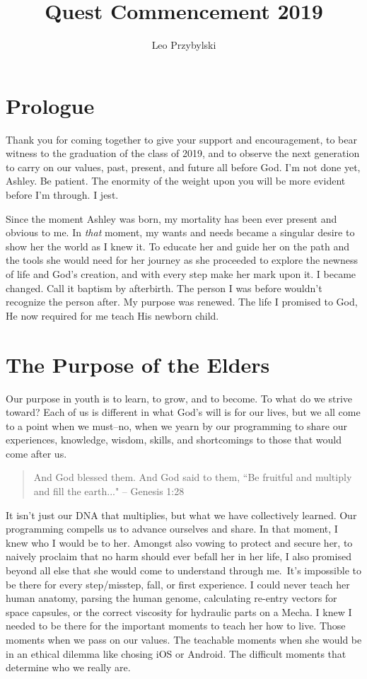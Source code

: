 \documentclass[11pt,a4paper,sans]{article}
\title{Quest Commencement 2019}
\author{Leo Przybylski}
\begin{document}
\maketitle
\tableofcontents
\section{Prologue}

Thank you for coming together to give your support and encouragement, to 
bear witness to the graduation of the class of 2019, and to observe the 
next generation to carry on our values, past, present, and future all before God.
I'm not done yet, Ashley. Be patient. The enormity of the weight upon you will 
be more evident before I'm through. I jest.

Since the moment Ashley was born, my mortality has been ever present and obvious to me.
In \emph{that} moment, my wants and needs became a singular desire to show her the 
world as I knew it. To educate her and guide her on the path and the tools she would 
need for her journey as she proceeded to explore the newness of life and 
God's creation, and with every step make her mark upon it. I became changed. Call it 
baptism by afterbirth. The person I was before wouldn't recognize the person after.
My purpose was renewed. The life I promised to God, He now required for me teach His
newborn child.

\section{The Purpose of the Elders}
Our purpose in youth is to learn, to grow, and to become. To what do we strive toward?
Each of us is different in what God's will is for our lives, but we all come to a point
when we must--no, when we yearn by our programming to share our experiences, knowledge,
wisdom, skills, and shortcomings to those that would come after us.

\begin{quote}
    And God blessed them. And God said to them, “Be fruitful and multiply and fill the earth..."
    -- Genesis 1:28
\end{quote}

It isn't just our DNA that multiplies, but what we have collectively learned. Our programming 
compells us to advance ourselves and share. In that moment, I knew who I would be to her. 
Amongst also vowing to protect and secure her, to naively proclaim that no harm should ever befall
her in her life, I also promised beyond all else that she would come to understand through
me. It's impossible to be there for every step/misstep, fall, or first experience. I could never 
teach her human anatomy, parsing the human genome, calculating re-entry vectors for space capsules,
or the correct viscosity for hydraulic parts on a Mecha. I knew I needed to be there for the 
important moments to teach her how to live. Those moments when we pass on our values. The 
teachable moments when she would be in an ethical dilemma like chosing iOS or Android. 
The difficult moments that determine who we really are.
\end{document}
